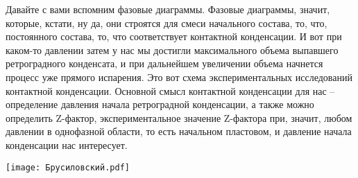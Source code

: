 \documentclass[main.tex]{subfiles}
\begin{document}
Давайте с вами вспомним фазовые диаграммы.
Фазовые диаграммы, значит, которые, кстати, ну да, они строятся для смеси начального состава, то, что, постоянного состава, то, что соответствует контактной конденсации.
И вот при каком-то давлении затем у нас мы достигли максимального объема выпавшего ретроградного конденсата, и при дальнейшем увеличении объема начнется процесс уже прямого испарения.
Это вот схема экспериментальных исследований контактной конденсации.
Основной смысл контактной конденсации для нас -- определение давления начала ретроградной конденсации, а также можно определить Z-фактор, экспериментальное значение Z-фактора при, значит, любом давлении в однофазной области, то есть начальном пластовом, и давление начала конденсации нас интересует.

\begin{center}
\texttt{[image: Брусиловский.pdf]}
\end{center}
\end{document}
